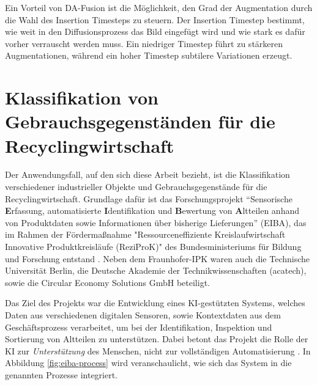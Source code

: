 Ein Vorteil von DA-Fusion ist die Möglichkeit, den Grad der Augmentation durch die Wahl des Insertion Timesteps zu steuern. Der Insertion Timestep bestimmt, wie weit in den Diffusionsprozess das Bild eingefügt wird und wie stark es dafür vorher verrauscht werden muss. Ein niedriger Timestep führt zu stärkeren Augmentationen, während ein hoher Timestep subtilere Variationen erzeugt.



\section{Klassifikation von Gebrauchsgegenständen für die Recyclingwirtschaft} \label{sec:recycling-classification} %

Der Anwendungsfall, auf den sich diese Arbeit bezieht, ist die Klassifikation verschiedener industrieller Objekte und Gebrauchsgegenstände für die Recyclingwirtschaft. Grundlage dafür ist das Forschungsprojekt “Sensorische \textbf{E}rfassung, automatisierte \textbf{I}dentifikation und \textbf{B}ewertung von \textbf{A}ltteilen anhand von Produktdaten sowie Informationen über bisherige Lieferungen” (EIBA), das im Rahmen der Fördermaßnahme "Ressourceneffiziente Kreislaufwirtschaft \textemdash Innovative Produktkreisläufe (ReziProK)" des Bundesministeriums für Bildung und Forschung entstand \parencite{Wagner2022reziprok}. Neben dem Fraunhofer-IPK waren auch die Technische Universität Berlin, die Deutsche Akademie der Technikwissenschaften (acatech), sowie die Circular Economy Solutions GmbH beteiligt.

Das Ziel des Projekts war die Entwicklung eines KI-gestützten Systems, welches Daten aus verschiedenen digitalen Sensoren, sowie Kontextdaten aus dem Geschäftsprozess verarbeitet, um bei der Identifikation, Inspektion und Sortierung von Altteilen zu unterstützen. Dabei betont das Projekt die Rolle der KI zur \textit{Unterstützung} des Menschen, nicht zur vollständigen Automatisierung \parencite{Wagner2022reziprok}. In Abbildung \ref{fig:eiba-process} wird veranschaulicht, wie sich das System in die genannten Prozesse integriert.

